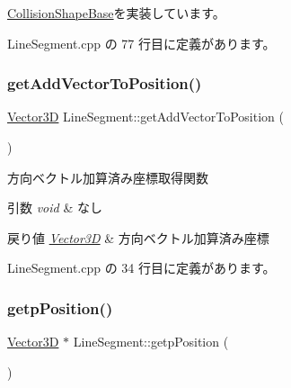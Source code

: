 \mbox{\hyperlink{class_collision_shape_base_ad227c2f83038d7c05bc6b1d510cb4000}{Collision\+Shape\+Base}}を実装しています。



 Line\+Segment.\+cpp の 77 行目に定義があります。

\mbox{\label{class_line_segment_af4c9249a6a1c6c75b12962ef29e6dd30}} 
\subsubsection{\texorpdfstring{get\+Add\+Vector\+To\+Position()}{getAddVectorToPosition()}}
{\footnotesize\ttfamily \mbox{\hyperlink{class_vector3_d}{Vector3D}} Line\+Segment\+::get\+Add\+Vector\+To\+Position (\begin{DoxyParamCaption}{ }\end{DoxyParamCaption})}



方向ベクトル加算済み座標取得関数 


\begin{DoxyParams}{引数}
{\em void} & なし \\
\hline
\end{DoxyParams}

\begin{DoxyRetVals}{戻り値}
{\em \mbox{\hyperlink{class_vector3_d}{Vector3D}}} & 方向ベクトル加算済み座標 \\
\hline
\end{DoxyRetVals}


 Line\+Segment.\+cpp の 34 行目に定義があります。

\mbox{\label{class_line_segment_ab32e8ccf6167f28f75382c94c6c7873d}} 
\subsubsection{\texorpdfstring{getp\+Position()}{getpPosition()}}
{\footnotesize\ttfamily \mbox{\hyperlink{class_vector3_d}{Vector3D}} $\ast$ Line\+Segment\+::getp\+Position (\begin{DoxyParamCaption}{ }\end{DoxyParamCaption})}



